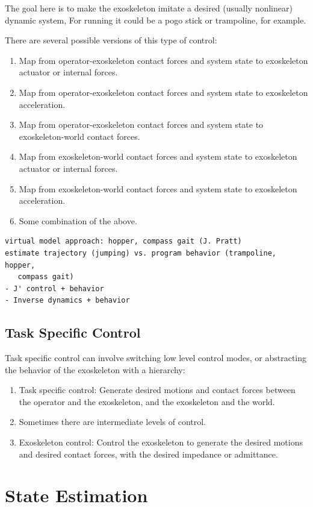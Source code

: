 \documentclass[letterpaper,12pt,fullpage]{article}
\begin{document}
The goal here is to make the exoskeleton imitate a desired (usually nonlinear)
dynamic system,
For running it could be a pogo stick or trampoline, for example.

There are several possible versions of this type of control:
\begin{enumerate}
\item
Map from operator-exoskeleton contact forces and system state
to exoskeleton actuator or internal forces.
\item
Map from operator-exoskeleton contact forces and system state
to exoskeleton acceleration.
\item
Map from operator-exoskeleton contact forces and system state
to exoskeleton-world contact forces.
\item
Map from exoskeleton-world contact forces and system state to exoskeleton actuator or internal forces.
\item
Map from exoskeleton-world contact forces and system state to exoskeleton acceleration.
\item
Some combination of the above.
\end{enumerate}

\begin{verbatim}
virtual model approach: hopper, compass gait (J. Pratt)
estimate trajectory (jumping) vs. program behavior (trampoline, hopper,
   compass gait)
- J' control + behavior
- Inverse dynamics + behavior
\end{verbatim}

\subsection{Task Specific Control}

Task specific control can involve switching low level control modes, or abstracting
the behavior of the exoskeleton with a hierarchy:
\begin{enumerate}
\item
Task specific control: Generate desired motions and contact forces between
the operator and the exoskeleton, and the exoskeleton and the world.
\item
Sometimes there are intermediate levels of control.
\item
Exoskeleton control: Control the exoskeleton to generate the desired motions and
desired contact forces, with the desired impedance or admittance.
\end{enumerate}

\section{State Estimation}
\end{document}

